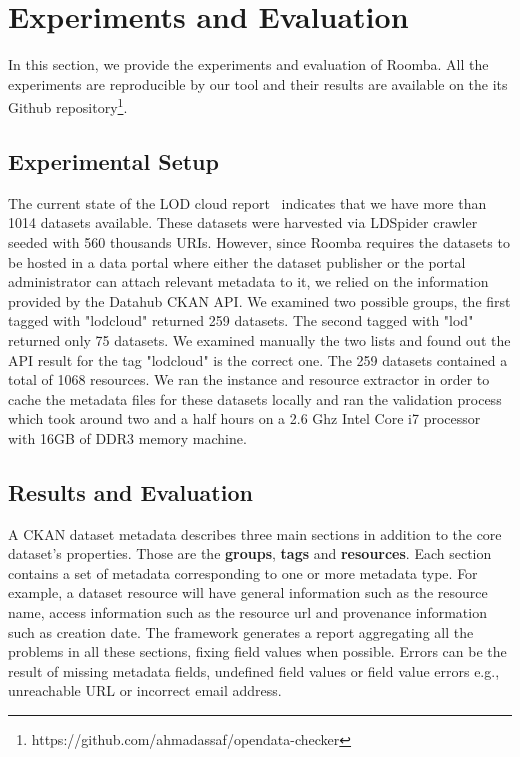 \documentclass[runningheads,a4paper]{llncs}
\begin{document}

\section{Experiments and Evaluation}
\label{sec:experiment}

In this section, we provide the experiments and evaluation of Roomba. All the experiments are reproducible by our tool and their results are available on the its Github repository\footnote{https://github.com/ahmadassaf/opendata-checker}.

\subsection{Experimental Setup}

The current state of the LOD cloud report~\cite{DBLP:conf/semweb/SchmachtenbergBP14} indicates that we have more than 1014 datasets available. These datasets were harvested via LDSpider crawler~\cite{conf/semweb/IseleUBH10} seeded with 560 thousands URIs. However, since Roomba requires the datasets to be hosted in a data portal where either the dataset publisher or the portal administrator can attach relevant metadata to it, we relied on the information provided by the Datahub CKAN API. We examined two possible groups, the first tagged with "lodcloud" returned 259 datasets. The second tagged with "lod" returned only 75 datasets. We examined manually the two lists and found out the API result for the tag "lodcloud" is the correct one. The 259 datasets contained a total of 1068 resources. We ran the instance and resource extractor in order to cache the metadata files for these datasets locally and ran the validation process which took around two and a half hours on a 2.6 Ghz Intel Core i7 processor with 16GB of DDR3 memory machine.

\subsection{Results and Evaluation}

A CKAN dataset metadata describes three main sections in addition to the core dataset's properties. Those are the \textbf{groups}, \textbf{tags} and \textbf{resources}. Each section contains a set of metadata corresponding to one or more metadata type. For example, a dataset resource will have general information such as the resource name, access information such as the resource url and provenance information such as creation date. The framework generates a report aggregating all the problems in all these sections, fixing field values when possible. Errors can be the result of missing metadata fields, undefined field values or field value errors e.g., unreachable URL or incorrect email address.
\end{document}
